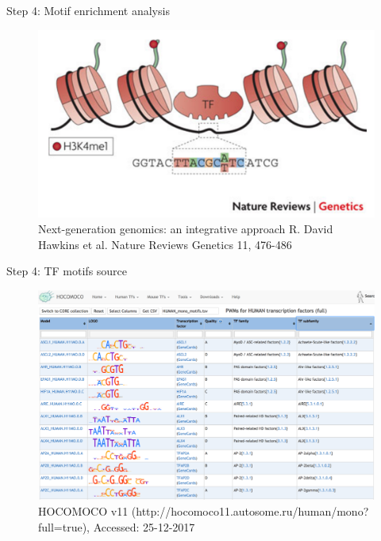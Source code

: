 \documentclass[slidestop,compress,11pt,xcolor=dvipsnames]{beamer}
\begin{document}
\begin{frame}{Step 4: Motif enrichment analysis}

 \vspace*{-0.3cm}
 \begin{figure}
  \centering
  \includegraphics[width=1.0\linewidth]{ELMER/tf_binding.png}{\tiny{\\Next-generation genomics: an integrative approach R. David Hawkins et al. Nature Reviews Genetics 11, 476-486}}
 \end{figure}
\end{frame}


\begin{frame}{Step 4:  TF motifs source}
 \vspace*{-0.3cm}
 \begin{figure}
  \centering
  \includegraphics[width=1.0\linewidth]{ELMER/hocomoco.png}{\tiny{\\HOCOMOCO v11 (http://hocomoco11.autosome.ru/human/mono?full=true), Accessed: 25-12-2017}}
 \end{figure}
\end{frame}
\end{document}
